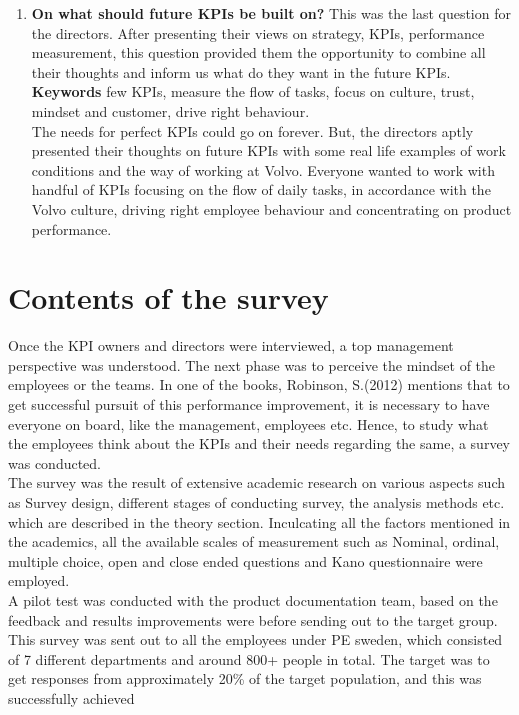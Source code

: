 \begin{enumerate}
\item \textbf{On what should future KPIs be built on?} This was the last question for the directors. After presenting their views on strategy, KPIs, performance measurement, this question provided them the opportunity to combine all their thoughts and inform us what do they want in the future KPIs.\\

\textbf{Keywords} few KPIs, measure the flow of tasks, focus on culture, trust, mindset and customer, drive right behaviour.\\

The needs for perfect KPIs could go on forever. But, the directors aptly presented their thoughts on future KPIs with some real life examples of work conditions and the way of working at Volvo. Everyone wanted to work with handful of KPIs focusing on the flow of daily tasks, in accordance with the Volvo culture, driving right employee behaviour and concentrating on product performance.\\

\end{enumerate}


\section{Contents of the survey}
Once the KPI owners and directors were interviewed, a top management perspective was understood. The next phase was to perceive the mindset of the employees or the teams. In one of the books, Robinson, S.(2012) mentions that to get successful pursuit of this performance improvement, it is necessary to have everyone on board, like the management, employees etc. Hence, to study what the employees think about the KPIs and their needs regarding the same, a survey was conducted.\\

The survey was the result of extensive academic research on various aspects such as Survey design, different stages of conducting survey, the analysis methods etc. which are described in the theory section. Inculcating all the factors mentioned in the academics, all the available scales of measurement such as Nominal, ordinal, multiple choice, open and close ended questions and Kano questionnaire were employed.\\


A pilot test was conducted with the product documentation team, based on the feedback and results improvements were before sending out to the target group. This survey was sent out to all the employees under PE sweden, which consisted of 7 different departments and around 800+ people in total. The target was to get responses from approximately 20\% of the target population, and this was successfully achieved \\

